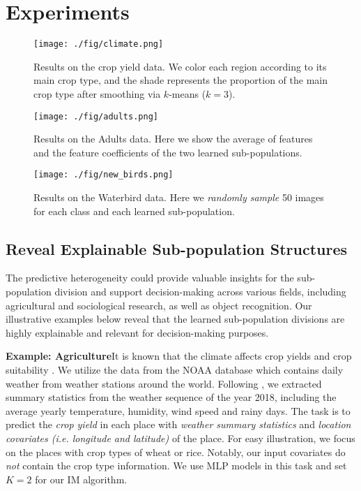 \section{Experiments}
\label{section:exp}

\begin{figure}[b]
  \centering
  \texttt{[image: ./fig/climate.png]}
  \vskip -0.1in
  \caption{Results on the crop yield data. We color each region according to its main crop type, and the shade represents the proportion of the main crop type after smoothing via $k$-means ($k=3$).}
  \label{fig:climate}
  \vskip -0.2in
\end{figure}

\begin{figure}[t]
\centering
\begin{minipage}{.48\textwidth}
  \centering
  \texttt{[image: ./fig/adults.png]}
  \caption{Results on the Adults data. Here we show the average of features and the feature coefficients of the two learned sub-populations.}
  \label{fig:test1}
\end{minipage}%
\hfill
\begin{minipage}{.48\textwidth}
  \centering
  \texttt{[image: ./fig/new\_birds.png]}
  \caption{Results on the Waterbird data. Here we \emph{randomly sample} 50 images for each class and each learned sub-population.}
  \label{fig:test2}
\end{minipage}
\vskip -0.2in
\end{figure}



\subsection{Reveal Explainable Sub-population Structures}
The predictive heterogeneity could provide valuable insights for the sub-population division and support decision-making across various fields, including agricultural and sociological research, as well as object recognition.
Our illustrative examples below reveal that the learned sub-population divisions are highly explainable and relevant for decision-making purposes.

\textbf{Example: Agriculture}\quad  It is known that the climate affects crop yields and crop suitability \citep{lobell2008prioritizing}.
We utilize the data from the NOAA database which contains daily weather from weather stations around the world.
Following \cite{zhao2021comparing}, we extracted summary statistics from the weather sequence of the year 2018, including the average yearly temperature, humidity, wind speed and rainy days.
The task is to predict the \emph{crop yield} in each place with \emph{weather summary statistics} and \emph{location covariates (i.e. longitude and latitude)} of the place.
For easy illustration, we focus on the places with crop types of wheat or rice.
Notably, our input covariates do \emph{not} contain the crop type information. 
We use MLP models in this task and set $K=2$ for our IM algorithm.

